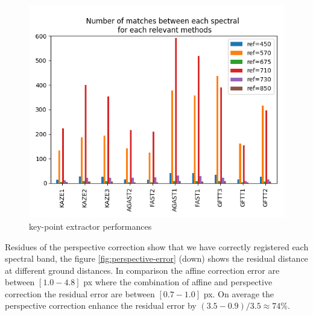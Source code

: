 \documentclass[a4paper,twoside]{article}
\begin{document}
	\begin{figure}[h]
		\centering
		\includegraphics[height=0.9\linewidth, angle=90]{../figures/comparaison-keypoint-matching-reference-merged}
		\caption{key-point extractor performances}
		\label{fig:features-GFTT-performances}
	\end{figure}
	
	\par Residues of the perspective correction show that we have correctly registered each spectral band,
	the figure \ref{fig:perspective-error} (down) shows the residual distance at different ground distances.
	In comparison the affine correction error are between $[1.0-4.8]$ px where the combination
	of affine and perspective correction the residual error are between $[0.7-1.0]$ px.
	On average the perspective correction enhance the residual error by $(3.5-0.9)/3.5 \approx 74\%$.
	
\end{document}
